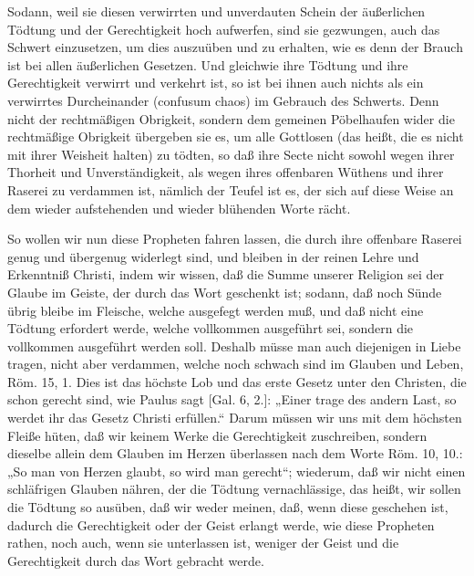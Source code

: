 Sodann, weil sie diesen verwirrten und unverdauten Schein der äußerlichen Tödtung und der Gerechtigkeit hoch aufwerfen, sind sie gezwungen, auch das Schwert einzusetzen, um dies auszuüben und zu erhalten, wie es denn der Brauch ist bei allen äußerlichen Gesetzen. Und gleichwie ihre Tödtung und ihre Gerechtigkeit verwirrt und verkehrt ist, so ist bei ihnen auch nichts als ein verwirrtes Durcheinander (confusum chaos) im Gebrauch des Schwerts. Denn nicht der rechtmäßigen Obrigkeit, sondern dem gemeinen Pöbelhaufen wider die rechtmäßige Obrigkeit übergeben sie es, um alle Gottlosen (das heißt, die es nicht mit ihrer Weisheit halten) zu tödten, so daß ihre Secte nicht sowohl wegen ihrer Thorheit und Unverständigkeit, als wegen ihres offenbaren Wüthens und ihrer Raserei zu verdammen ist, nämlich der Teufel ist es, der sich auf diese Weise an dem wieder aufstehenden und wieder blühenden Worte rächt.

So wollen wir nun diese Propheten fahren lassen, die durch ihre offenbare Raserei genug und übergenug widerlegt sind, und bleiben in der reinen Lehre und Erkenntniß Christi, indem wir wissen, daß die Summe unserer Religion sei der Glaube im Geiste, der durch das Wort geschenkt ist; sodann, daß noch Sünde übrig bleibe im Fleische, welche ausgefegt werden muß, und daß nicht eine Tödtung erfordert werde, welche vollkommen ausgeführt sei, sondern die vollkommen ausgeführt werden soll. Deshalb müsse man auch diejenigen in Liebe tragen, nicht aber verdammen, welche noch schwach sind im Glauben und Leben, Röm. 15, 1. Dies ist das höchste Lob und das erste Gesetz unter den Christen, die schon gerecht sind, wie Paulus sagt [Gal. 6, 2.]: „Einer trage des andern Last, so werdet ihr das Gesetz Christi erfüllen.“ Darum müssen wir uns mit dem höchsten Fleiße hüten, daß wir keinem Werke die Gerechtigkeit zuschreiben, sondern dieselbe allein dem Glauben im Herzen überlassen nach dem Worte Röm. 10, 10.: „So man von Herzen glaubt, so wird man gerecht“; wiederum, daß wir nicht einen schläfrigen Glauben nähren, der die Tödtung vernachlässige, das heißt, wir sollen die Tödtung so ausüben, daß wir weder meinen, daß, wenn diese geschehen ist, dadurch die Gerechtigkeit oder der Geist erlangt werde, wie diese Propheten rathen, noch auch, wenn sie unterlassen ist, weniger der Geist und die Gerechtigkeit durch das Wort gebracht werde.

